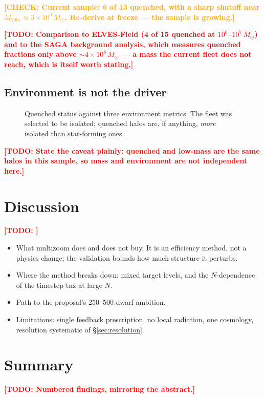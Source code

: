 \documentclass[twocolumn,linenumbers]{aastex631}
\newcommand{\todo}[1]{\textcolor{red}{\textbf{[TODO: #1]}}}
\newcommand{\check}[1]{\textcolor{orange}{\textbf{[CHECK: #1]}}}
\newcommand{\Msun}{\ensuremath{M_\odot}}
\newcommand{\Mvir}{\ensuremath{M_{200\mathrm{c}}}}
\begin{document}
\check{Current sample: 6 of 13 quenched, with a sharp shutoff near
$\Mvir \approx 3\times10^{9}\,\Msun$. Re-derive at freeze --- the sample is
growing.}

\todo{Comparison to ELVES-Field (4 of 15 quenched at
$10^6$--$10^7\,\Msun$) and to the SAGA background analysis, which measures
quenched fractions only above $\sim 4\times10^{8}\,\Msun$ --- a mass the
current fleet does not reach, which is itself worth stating.}

\subsection{Environment is not the driver}
\begin{figure}
\caption{Quenched status against three environment metrics. The fleet was
selected to be isolated; quenched halos are, if anything, \emph{more}
isolated than star-forming ones.}
\label{fig:environment}
\end{figure}
\todo{State the caveat plainly: quenched and low-mass are the same halos in
this sample, so mass and environment are not independent here.}

\section{Discussion}
\label{sec:discussion}
\todo{}
\begin{itemize}
\item What multizoom does and does not buy. It is an efficiency method, not a
      physics change; the validation bounds how much structure it perturbs.
\item Where the method breaks down: mixed target levels, and the
      $N$-dependence of the timestep tax at large $N$.
\item Path to the proposal's 250--500 dwarf ambition.
\item Limitations: single feedback prescription, no local radiation, one
      cosmology, resolution systematic of \S\ref{sec:resolution}.
\end{itemize}

\section{Summary}
\label{sec:summary}
\todo{Numbered findings, mirroring the abstract.}
\end{document}
